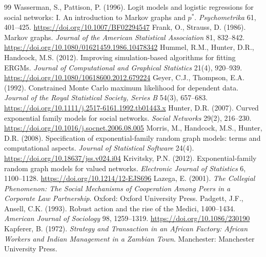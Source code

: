 \documentclass[11pt,a4paper]{report}
\begin{document}
\begin{thebibliography}{99}
 Wasserman, S., Pattison, P. (1996). Logit models and logistic regressions for social networks: I. An introduction to Markov graphs and $p^*$. \emph{Psychometrika} 61, 401--425. \url{https://doi.org/10.1007/BF02294547}
 Frank, O., Strauss, D. (1986). Markov graphs. \emph{Journal of the American Statistical Association} 81, 832--842. \url{https://doi.org/10.1080/01621459.1986.10478342}
 Hummel, R.M., Hunter, D.R., Handcock, M.S. (2012). Improving simulation-based algorithms for fitting ERGMs. \emph{Journal of Computational and Graphical Statistics} 21(4), 920--939. \url{https://doi.org/10.1080/10618600.2012.679224}
 Geyer, C.J., Thompson, E.A. (1992). Constrained Monte Carlo maximum likelihood for dependent data. \emph{Journal of the Royal Statistical Society, Series B} 54(3), 657--683. \url{https://doi.org/10.1111/j.2517-6161.1992.tb01443.x}
 Hunter, D.R. (2007). Curved exponential family models for social networks. \emph{Social Networks} 29(2), 216--230. \url{https://doi.org/10.1016/j.socnet.2006.08.005}
 Morris, M., Handcock, M.S., Hunter, D.R. (2008). Specification of exponential-family random graph models: terms and computational aspects. \emph{Journal of Statistical Software} 24(4). \url{https://doi.org/10.18637/jss.v024.i04}
 Krivitsky, P.N. (2012). Exponential-family random graph models for valued networks. \emph{Electronic Journal of Statistics} 6, 1100--1128. \url{https://doi.org/10.1214/12-EJS696}
 Lazega, E. (2001). \emph{The Collegial Phenomenon: The Social Mechanisms of Cooperation Among Peers in a Corporate Law Partnership}. Oxford: Oxford University Press.
 Padgett, J.F., Ansell, C.K. (1993). Robust action and the rise of the Medici, 1400--1434. \emph{American Journal of Sociology} 98, 1259--1319. \url{https://doi.org/10.1086/230190}
 Kapferer, B. (1972). \emph{Strategy and Transaction in an African Factory: African Workers and Indian Management in a Zambian Town}. Manchester: Manchester University Press.
\end{thebibliography}
\end{document}
